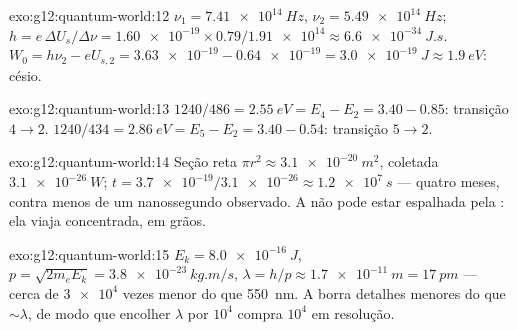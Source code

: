 \begin{solution}{exo:g12:quantum-world:12}
$\nu_1 = \qty{7.41e14}{Hz}$, $\nu_2 = \qty{5.49e14}{Hz}$;
$h = e\,\Delta U_s/\Delta\nu = \num{1.60e-19} \times 0.79 /
\num{1.91e14} \approx \qty{6.6e-34}{J.s}$.
$W_0 = h\nu_2 - eU_{s,2} = \num{3.63e-19} - \num{0.64e-19} =
\qty{3.0e-19}{J} \approx \qty{1.9}{eV}$: césio.
\end{solution}

\begin{solution}{exo:g12:quantum-world:13}
$1240/486 = \qty{2.55}{eV} = E_4 - E_2 = 3.40 - 0.85$: transição
$4 \to 2$. $1240/434 = \qty{2.86}{eV} = E_5 - E_2 = 3.40 - 0.54$:
transição $5 \to 2$.
\end{solution}

\begin{solution}{exo:g12:quantum-world:14}
Seção reta $\pi r^2 \approx \qty{3.1e-20}{m^2}$,  coletada
$\qty{3.1e-26}{W}$;
$t = \num{3.7e-19}/\num{3.1e-26} \approx \qty{1.2e7}{s}$ --- quatro
meses, contra menos de um nanossegundo observado. A  não pode
estar espalhada pela : ela viaja concentrada, em grãos.
\end{solution}

\begin{solution}{exo:g12:quantum-world:15}
$E_k = \qty{8.0e-16}{J}$,
$p = \sqrt{2m_e E_k} = \qty{3.8e-23}{kg.m/s}$,
$\lambda = h/p \approx \qty{1.7e-11}{m} = \qty{17}{pm}$ --- cerca de
$\num{3e4}$ vezes menor do que \qty{550}{nm}. A  borra detalhes
menores do que $\sim\lambda$, de modo que encolher $\lambda$ por $10^4$
compra $10^4$ em resolução.
\end{solution}

